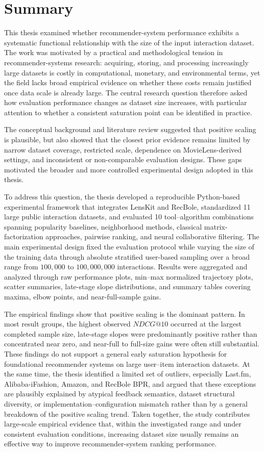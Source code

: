 \documentclass[12pt,a4paper]{article}
\begin{document}
\section{Summary}
This thesis examined whether recommender-system performance exhibits a systematic functional relationship with the size of the input interaction dataset. The work was motivated by a practical and methodological tension in recommender-systems research: acquiring, storing, and processing increasingly large datasets is costly in computational, monetary, and environmental terms, yet the field lacks broad empirical evidence on whether these costs remain justified once data scale is already large. The central research question therefore asked how evaluation performance changes as dataset size increases, with particular attention to whether a consistent saturation point can be identified in practice.

The conceptual background and literature review suggested that positive scaling is plausible, but also showed that the closest prior evidence remains limited by narrow dataset coverage, restricted scale, dependence on MovieLens-derived settings, and inconsistent or non-comparable evaluation designs. These gaps motivated the broader and more controlled experimental design adopted in this thesis.

To address this question, the thesis developed a reproducible Python-based experimental framework that integrates LensKit and RecBole, standardized 11 large public interaction datasets, and evaluated 10 tool--algorithm combinations spanning popularity baselines, neighborhood methods, classical matrix-factorization approaches, pairwise ranking, and neural collaborative filtering. The main experimental design fixed the evaluation protocol while varying the size of the training data through absolute stratified user-based sampling over a broad range from $100{,}000$ to $100{,}000{,}000$ interactions. Results were aggregated and analyzed through raw performance plots, min--max normalized trajectory plots, scatter summaries, late-stage slope distributions, and summary tables covering maxima, elbow points, and near-full-sample gains.

The empirical findings show that positive scaling is the dominant pattern. In most result groups, the highest observed $NDCG@10$ occurred at the largest completed sample size, late-stage slopes were predominantly positive rather than concentrated near zero, and near-full to full-size gains were often still substantial. These findings do not support a general early saturation hypothesis for foundational recommender systems on large user--item interaction datasets. At the same time, the thesis identified a limited set of outliers, especially Last.fm, Alibaba-iFashion, Amazon, and RecBole BPR, and argued that these exceptions are plausibly explained by atypical feedback semantics, dataset structural diversity, or implementation--configuration mismatch rather than by a general breakdown of the positive scaling trend. Taken together, the study contributes large-scale empirical evidence that, within the investigated range and under consistent evaluation conditions, increasing dataset size usually remains an effective way to improve recommender-system ranking performance.
\end{document}
